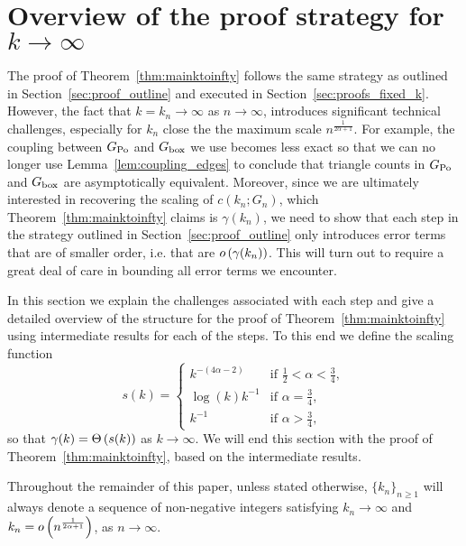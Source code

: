 
\section{Overview of the proof strategy for $k \to \infty$}

The proof of Theorem~\ref{thm:mainktoinfty} follows the same strategy as outlined in Section~\ref{sec:proof_outline} and executed in Section~\ref{sec:proofs_fixed_k}. However, the fact that $k = k_n \to \infty$ as $n \to \infty$, introduces significant technical challenges, especially for $k_n$ close the the maximum scale $n^{\frac{1}{2\alpha + 1}}$. For example, the coupling between $G_{{\mathrm{Po}}}$ and $G_{\mathrm{box}}$ we use becomes less exact so that we can no longer use Lemma~\ref{lem:coupling_edges} to conclude that triangle counts in $G_{{\mathrm{Po}}}$ and $G_{\mathrm{box}}$ are asymptotically equivalent. Moreover, since we are ultimately interested in recovering the scaling of $c(k_n;G_n)$, which Theorem~\ref{thm:mainktoinfty} claims is $\gamma(k_n)$, we need to show that each step in the strategy outlined in Section~\ref{sec:proof_outline} only introduces error terms that are of smaller order, i.e. that are $o\left(\gamma(k_n)\right)$. This will turn out to require a great deal of care in bounding all error terms we encounter.

In this section we explain the challenges associated with each step and give a detailed overview of the structure for the proof of Theorem~\ref{thm:mainktoinfty} using intermediate results for each of the steps. To this end we define the scaling function
\begin{equation}\label{eq:def_scaling_function}
	s(k) = \begin{cases}
		k^{-(4\alpha - 2)} &\mbox{if } \frac{1}{2} < \alpha < \frac{3}{4},\\
		\log(k) k^{-1} &\mbox{if } \alpha = \frac{3}{4},\\
		k^{-1} &\mbox{if } \alpha > \frac{3}{4},
	\end{cases}
\end{equation}
so that $\gamma(k) = \Theta\left(s(k)\right)$ as $k \to \infty$. We will end this section with the proof of Theorem~\ref{thm:mainktoinfty}, based on the intermediate results.

\begin{remark}[Diverging $k_n$]
Throughout the remainder of this paper, unless stated otherwise, $\{k_n\}_{n \ge 1}$ will always denote a sequence of non-negative integers satisfying $k_n \to \infty$ and $k_n = o\left(n^{\frac{1}{2\alpha + 1}}\right)$, as $n \to \infty$.
\end{remark}

